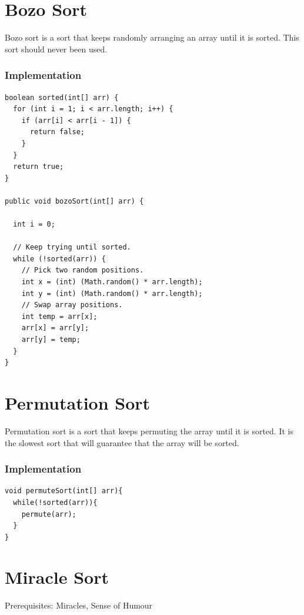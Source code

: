 \documentclass[11pt,oneside]{book}
\begin{document}
        \section{ Bozo Sort }
        

Bozo sort is a sort that keeps randomly arranging an array until it is sorted. This sort should never been used.

\subsubsection{Implementation}

\begin{lstlisting}
boolean sorted(int[] arr) {
  for (int i = 1; i < arr.length; i++) {
    if (arr[i] < arr[i - 1]) {
      return false;
    }
  }
  return true;
}

public void bozoSort(int[] arr) {

  int i = 0;

  // Keep trying until sorted.
  while (!sorted(arr)) {
    // Pick two random positions.
    int x = (int) (Math.random() * arr.length);
    int y = (int) (Math.random() * arr.length);
    // Swap array positions.
    int temp = arr[x];
    arr[x] = arr[y];
    arr[y] = temp;
  }
}
\end{lstlisting}

        \section{ Permutation Sort }
        

Permutation sort is a sort that keeps permuting the array until it is sorted. It is the slowest sort that will guarantee that the array will be sorted.

\subsubsection{Implementation}

\begin{lstlisting}
void permuteSort(int[] arr){
  while(!sorted(arr)){
    permute(arr);
  }
}
\end{lstlisting}

        \section{ Miracle Sort }
        

Prerequisites: Miracles, Sense of Humour
\end{document}
